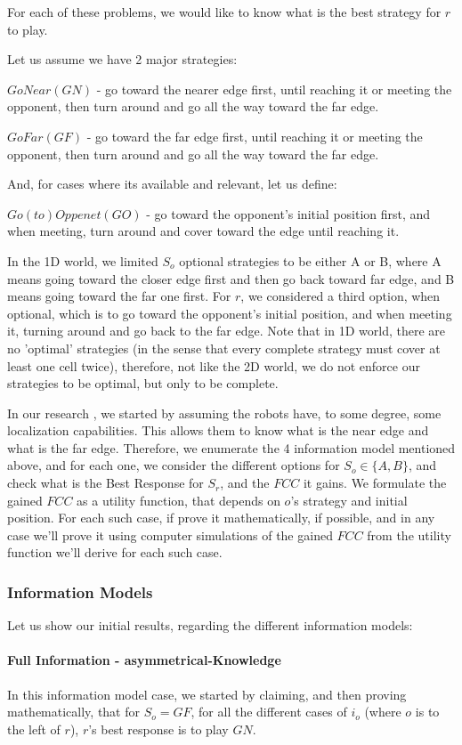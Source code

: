 \documentclass[a4paper,english,10pt]{article}
\newcommand\rob{\ensuremath{r}\xspace}
\newcommand\opp{\ensuremath{o}\xspace}
\newcommand{\fcc}{\ensuremath{FCC}\xspace}
\newcommand{\gn}{\ensuremath{GN}\xspace}
\newcommand{\gf}{\ensuremath{GF}\xspace}
\newcommand{\go}{\ensuremath{GO}\xspace}
\begin{document}
For each of these problems, we would like to know what is the best strategy for \rob to play.

Let us assume we have 2 major strategies:

$GoNear(\gn)$ - go toward the nearer edge first, until reaching it or meeting the opponent, then turn around and go all the way toward the far edge.

$GoFar(\gf)$ - go toward the far edge first, until reaching it or meeting the opponent, then turn around and go all the way toward the far edge.

And, for cases where its available and relevant, let us define:

$Go(to)Oppenet(\go)$ - go toward the opponent's initial position first, and when meeting, turn around and cover toward the edge until reaching it.

In the 1D world, we limited $S_\opp$ optional strategies to be either A or B, where A means going toward the closer edge first and then go back toward far edge, and B means going toward the far one first. For \rob, we considered a third option, when optional, which is to go toward the opponent's initial position, and when meeting it, turning around and go back to the far edge.
Note that in 1D world, there are no 'optimal' strategies (in the sense that every complete strategy must cover at least one cell twice), therefore, not like the 2D world, we do not enforce our strategies to be optimal, but only to be complete.

In our research , we started by assuming the robots have, to some degree, some localization capabilities. This allows them to know what is the near edge and what is the far edge.
Therefore, we enumerate the 4 information model mentioned above, and for each one, we consider the different options for $S_\opp\in \lbrace A,B\rbrace$, and check what is the Best Response for $S_\rob$, and the \fcc it gains. We formulate the gained \fcc as a utility function, that depends on \opp's strategy and initial position.
For each such case, if prove it mathematically, if possible, and in any case we'll prove it using computer simulations of the gained \fcc from the utility function we'll derive for each such case.


\subsubsection{Information Models}
Let us show our initial results, regarding the different information models:
\paragraph{Full Information - asymmetrical-Knowledge}
In this information model case, we started by claiming, and then proving mathematically, that for $S_\opp = \gf$, for all the different cases of $i_\opp$ (where \opp is to the left of \rob), \rob's best response is to play $\gn$.
\end{document}
